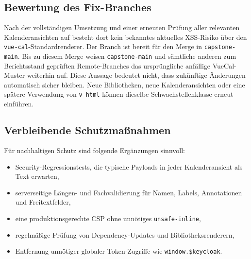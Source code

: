 \subsection{Bewertung des Fix-Branches}

Nach der vollständigen Umsetzung und einer erneuten Prüfung aller
relevanten Kalenderansichten auf
 besteht dort kein bekanntes
aktuelles XSS-Risiko über den \texttt{vue-cal}-Standardrenderer. Der
Branch ist bereit für den Merge in \texttt{capstone-main}. Bis zu
diesem Merge weisen \texttt{capstone-main} und sämtliche anderen zum
Berichtsstand geprüften Remote-Branches das ursprüngliche anfällige
VueCal-Muster weiterhin auf. Diese Aussage bedeutet nicht, dass
zukünftige Änderungen automatisch sicher bleiben. Neue Bibliotheken,
neue Kalenderansichten oder eine spätere Verwendung von
\texttt{v-html} können dieselbe Schwachstellenklasse erneut
einführen.

\subsection{Verbleibende Schutzmaßnahmen}

Für nachhaltigen Schutz sind folgende Ergänzungen sinnvoll:

\begin{itemize}
  \item Security-Regressionstests, die typische Payloads in jeder
    Kalenderansicht als Text erwarten,
  \item serverseitige Längen- und Fachvalidierung für Namen, Labels,
    Annotationen und Freitextfelder,
  \item eine produktionsgerechte CSP ohne unnötiges \texttt{unsafe-inline},
  \item regelmäßige Prüfung von Dependency-Updates und Bibliotheksrenderern,
  \item Entfernung unnötiger globaler Token-Zugriffe wie
    \texttt{window.\$keycloak}.
\end{itemize}
